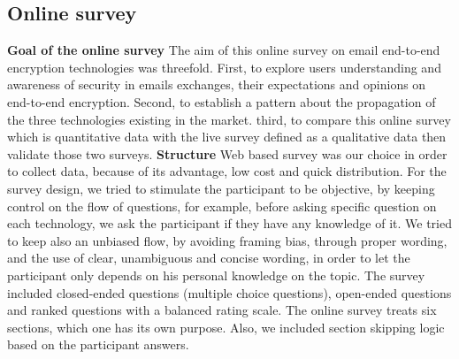 \subsection{Online survey}
\textbf{\newline Goal of the online survey}
\newline
The aim of this online survey on email end-to-end encryption technologies was threefold. First, to explore users understanding and awareness of security in emails exchanges, their expectations and opinions on end-to-end encryption. Second, to establish a pattern about the propagation of the three technologies existing in the market. third, to compare this online survey which is quantitative data with the live survey defined as a qualitative data then validate those two surveys.
\newline
\newline  
\textbf{Structure}
\newline
Web based survey was our choice in order to collect data, because of its advantage, low cost and quick distribution. For the survey design, we tried to stimulate the participant to be objective, by keeping control on the flow of questions, for example, before asking specific question on each technology, we ask the participant if they have any knowledge of it. 
We tried to keep also an unbiased flow, by avoiding framing bias, through proper wording, and the use of clear, unambiguous and concise wording, in order to let the participant only depends on his personal knowledge on the topic.
The survey included closed-ended questions (multiple choice questions), open-ended questions and ranked questions with a balanced rating scale.
The online survey treats six sections, which one has its own purpose. Also, we included section skipping logic based on the participant answers.

